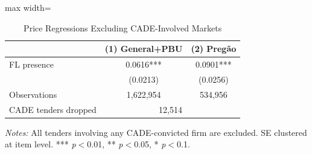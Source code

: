 \begin{table}[htbp]
\centering
\caption{Price Regressions Excluding CADE-Involved Markets}
\label{tab:excl_cade}
\begin{adjustbox}{max width=\textwidth}
\begin{threeparttable}
\small
\begin{tabular}{lcc}
\toprule
 & (1) General+PBU & (2) Preg\~{a}o \\
\midrule
FL presence & 0.0616*** & 0.0901*** \\
 & (0.0213) & (0.0256) \\
\midrule
Observations & 1,622,954 & 534,956 \\
CADE tenders dropped & \multicolumn{2}{c}{12,514} \\
\bottomrule
\end{tabular}
\begin{tablenotes}
\small
\item \textit{Notes:} All tenders involving any CADE-convicted firm are excluded. SE clustered at item level.
*** \textit{p}$<$0.01, ** \textit{p}$<$0.05, * \textit{p}$<$0.1.
\end{tablenotes}
\end{threeparttable}
\end{adjustbox}
\end{table}
